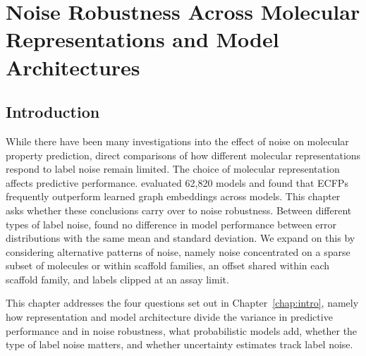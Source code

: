 \chapter{Noise Robustness Across Molecular Representations and Model Architectures}\label{chap:robustness}


\section{Introduction}


While there have been many investigations into the effect of noise on molecular property prediction, direct comparisons of how different molecular representations respond to label noise remain limited. The choice of molecular representation affects predictive performance. \citet{Deng2023} evaluated 62,820 models and found that ECFPs frequently outperform learned graph embeddings across models. This chapter asks whether these conclusions carry over to noise robustness. Between different types of label noise, \citet{Heid2023} found no difference in model performance between error distributions with the same mean and standard deviation. We expand on this by considering alternative patterns of noise, namely noise concentrated on a sparse subset of molecules or within scaffold families, an offset shared within each scaffold family, and labels clipped at an assay limit.

This chapter addresses the four questions set out in Chapter~\ref{chap:intro}, namely how representation and model architecture divide the variance in predictive performance and in noise robustness, what probabilistic models add, whether the type of label noise matters, and whether uncertainty estimates track label noise.

